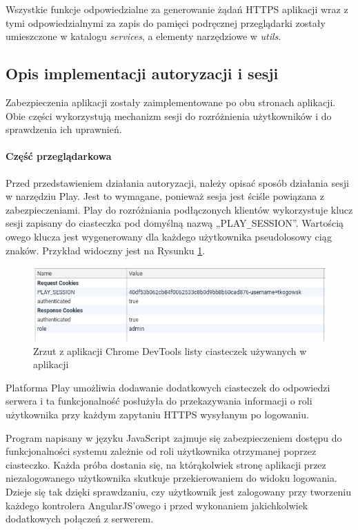 \documentclass[a4paper,12pt,twoside]{article}
\begin{document}
Wszystkie funkcje odpowiedzialne za generowanie
żądań HTTPS aplikacji wraz z tymi odpowiedzialnymi
za zapis do pamięci podręcznej przeglądarki zostały umieszczone w
katalogu \textit{services}, a elementy narzędziowe w \textit{utils}.

\subsection{Opis implementacji autoryzacji i sesji}

Zabezpieczenia aplikacji zostały zaimplementowane po obu stronach aplikacji.
Obie części wykorzystują mechanizm sesji do rozróżnienia użytkowników
i do sprawdzenia ich uprawnień.

\paragraph{Część przeglądarkowa}
Przed przedstawieniem działania autoryzacji, należy opisać
sposób działania sesji w narzędziu Play. Jest to wymagane, ponieważ
sesja jest ściśle powiązana z zabezpieczeniami.
Play do rozróżniania podłączonych klientów wykorzystuje klucz sesji zapisany do
ciasteczka pod domyślną nazwą „PLAY\verb!_!SESSION”.
Wartością owego klucza jest wygenerowany dla każdego użytkownika pseudolosowy ciąg znaków. Przykład widoczny jest na Rysunku \ref{fig:cookiespic}.

\begin{figure}[h]
\includegraphics[width=\linewidth]{obrazy/aplikacja/cookies.png}
\caption{Zrzut z aplikacji Chrome DevTools listy ciasteczek używanych w aplikacji}
\label{fig:cookiespic}
\end{figure}
\newpage

Platforma Play umożliwia dodawanie dodatkowych ciasteczek do odpowiedzi serwera
i ta funkcjonalność posłużyła do przekazywania informacji o roli użytkownika przy każdym zapytaniu HTTPS wysyłanym po logowaniu.

Program napisany w języku JavaScript zajmuje się zabezpieczeniem
dostępu do funkcjonalności systemu zależnie od roli użytkownika otrzymanej
poprzez ciasteczko.
Każda próba dostania się, na którąkolwiek stronę aplikacji przez niezalogowanego użytkownika skutkuje przekierowaniem do widoku logowania.
Dzieje się tak dzięki sprawdzaniu, czy użytkownik jest zalogowany przy tworzeniu każdego kontrolera AngularJS'owego i przed
wykonaniem jakichkolwiek dodatkowych połączeń z serwerem.
\end{document}
